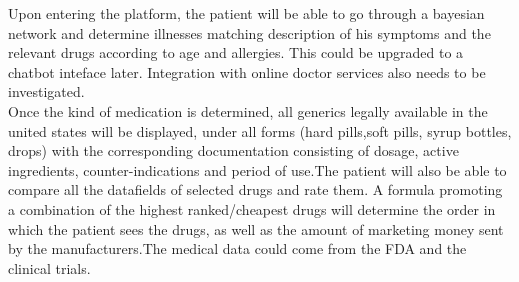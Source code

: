 Upon entering the platform, the patient will be able to go through a bayesian network and determine illnesses matching description of his symptoms and the relevant drugs according to age and allergies. This could be upgraded to a chatbot inteface later. Integration with online doctor services also needs to be investigated.\\

Once the kind of medication is determined, all generics legally available in the united states will be displayed, under all forms (hard pills,soft pills, syrup bottles, drops) with the corresponding documentation consisting of dosage, active ingredients, counter-indications and period of use.The patient will also be able to compare all the datafields of selected drugs and rate them. A formula promoting a combination of the highest ranked/cheapest drugs will determine the order in which the patient sees the drugs, as well as the amount of marketing money sent by the manufacturers.The medical data could come from the FDA and the clinical trials.
